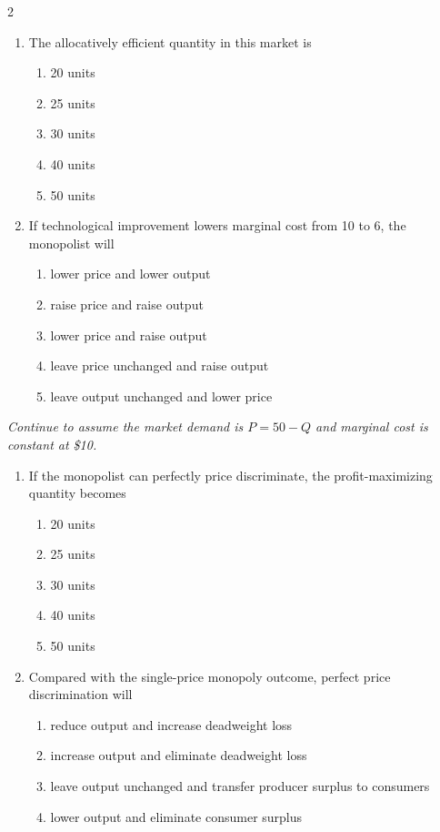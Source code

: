 \documentclass[10pt]{article}
\newenvironment{choiceslist}
  {\begin{enumerate}[label=(\Alph*), leftmargin=1.6em, itemsep=0.12em, topsep=0.18em, parsep=0pt]}
  {\end{enumerate}}
\newenvironment{stimulus}
  {\begin{center}\begin{minipage}{0.96\columnwidth}\footnotesize\itshape\setlength{\tabcolsep}{3pt}\renewcommand{\arraystretch}{0.96}}
  {\end{minipage}\end{center}}
\begin{document}
\begin{multicols*}{2}
\begin{enumerate}[resume*=apq, leftmargin=*, itemsep=0.85em, topsep=0.2em, parsep=0pt]
\item The allocatively efficient quantity in this market is
\begin{choiceslist}
\item 20 units
\item 25 units
\item 30 units
\item 40 units
\item 50 units
\end{choiceslist}
\item If technological improvement lowers marginal cost from 10 to 6, the monopolist will
\begin{choiceslist}
\item lower price and lower output
\item raise price and raise output
\item lower price and raise output
\item leave price unchanged and raise output
\item leave output unchanged and lower price
\end{choiceslist}
\end{enumerate}
\begin{stimulus}
Continue to assume the market demand is $P = 50 - Q$ and marginal cost is constant at \$10.
\end{stimulus}
\begin{enumerate}[resume*=apq, leftmargin=*, itemsep=0.85em, topsep=0.2em, parsep=0pt]
\item If the monopolist can perfectly price discriminate, the profit-maximizing quantity becomes
\begin{choiceslist}
\item 20 units
\item 25 units
\item 30 units
\item 40 units
\item 50 units
\end{choiceslist}
\item Compared with the single-price monopoly outcome, perfect price discrimination will
\begin{choiceslist}
\item reduce output and increase deadweight loss
\item increase output and eliminate deadweight loss
\item leave output unchanged and transfer producer surplus to consumers
\item lower output and eliminate consumer surplus

\end{choiceslist}
\end{enumerate}
\end{multicols*}
\end{document}
